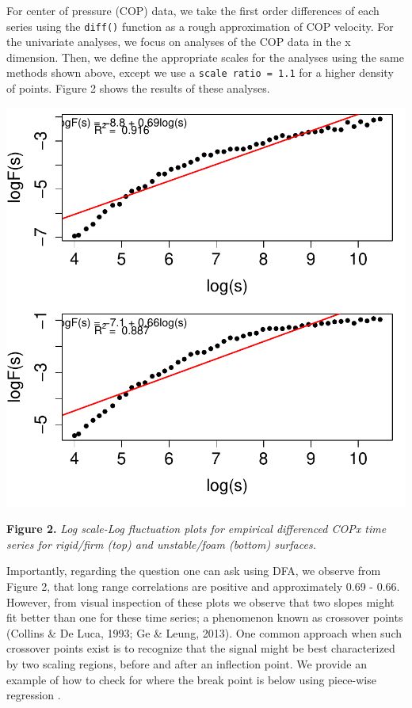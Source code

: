 \documentclass[
  man]{apa6}
\begin{document}
For center of pressure (COP) data, we take the first order differences
of each series using the \texttt{diff()} function as a rough approximation of
COP velocity. For the univariate analyses, we focus on analyses of the
COP data in the x dimension. Then, we define the appropriate scales for
the analyses using the same methods shown above, except we use a
\texttt{scale\ ratio\ =\ 1.1} for a higher density of points. Figure 2 shows the
results of these analyses.

\includegraphics{fractal_regression_paper_brm_files/figure-latex/unnamed-chunk-5-1.pdf}

\textbf{Figure 2.} \emph{Log scale-Log fluctuation plots for empirical differenced
COPx time series for rigid/firm (top) and unstable/foam (bottom)
surfaces.}

Importantly, regarding the question one can ask using DFA, we observe
from Figure 2, that long range correlations are positive and
approximately 0.69 -
0.66. However, from visual inspection of
these plots we observe that two slopes might fit better than one for
these time series; a phenomenon known as crossover points (Collins \& De Luca, 1993; Ge \& Leung, 2013). One common approach when such crossover points exist is to
recognize that the signal might be best characterized by two scaling
regions, before and after an inflection point. We provide an example of
how to check for where the break point is below using piece-wise
regression .
\end{document}
